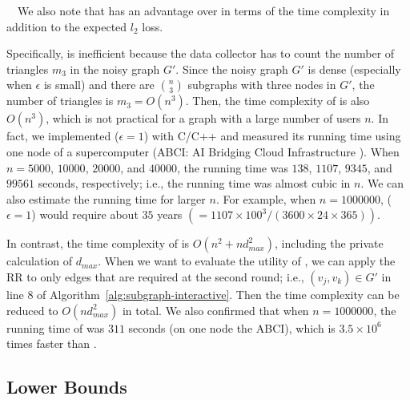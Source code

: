 \smallskip
{}~~We also note that  has an advantage over  in terms of the time complexity in addition to the expected $l_2$ loss. 

Specifically,  is inefficient because the data collector has to count the number of triangles $m_3$ in the noisy graph $G'$. 
Since the noisy graph $G'$ is dense (especially when $\epsilon$ is small) and there are $\binom{n}{3}$ subgraphs with three nodes in $G'$, the number of triangles is $m_3 = O(n^3)$. 
Then, the time complexity of  is 
also $O(n^3)$, which is not practical for a graph with a large number of users $n$.
In fact, we implemented  ($\epsilon=1$) with C/C++ and measured its running time using one node of a supercomputer (ABCI: AI Bridging Cloud Infrastructure \cite{ABCI}). 
When $n=5000$, $10000$, $20000$, and $40000$, the running time was $138$, $1107$, $9345$, and $99561$ seconds, respectively; i.e., the running time was almost cubic in $n$. 
We can also estimate the running time for larger $n$. 
For example, when $n=1000000$,  ($\epsilon=1$) would require about $35$ years $(=1107 \times 100^3 /(3600 \times 24 \times 365))$. 

In contrast, the time complexity of  
is 
$O(n^2 + n d_{max}^2)$, including the private calculation of $d_{max}$. 
When we want to evaluate the utility of , 
we can apply the RR to only edges that are required at the second round; i.e., $(v_j,v_k) \in G'$ in line 8 of Algorithm~\ref{alg:subgraph-interactive}. 
Then the time complexity 
can be reduced to 
$O(n d_{max}^2)$ in total. 
We also confirmed that 
when $n=1000000$, the running time of  was $311$ seconds (on one node the ABCI), which is $3.5 \times 10^6$ times faster than . 

\subsection{Lower Bounds}
\label{sub:lower_bounds}

